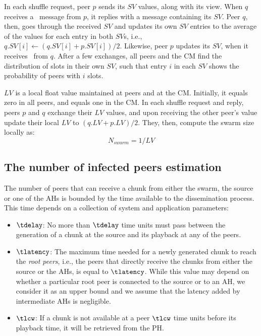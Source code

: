 In each shuffle request, peer $p$ sends its $SV$ values, along with its view. When $q$ receives a \request\ message from $p$, it replies with a message containing its $SV$. Peer $q$, then, goes through the
received $SV$ and updates its own $SV$ entries to the average of the values for each entry in both $SV$s, i.e., $q.SV[i] \gets (q.SV[i] + p.SV[i])/2$. Likewise, peer $p$ updates its $SV$, when it receives \reply\ from $q$. After a few exchanges, all peers and the CM find the distribution of slots in their own $SV$, such that entry $i$ in each $SV$ shows the probability of peers with $i$ slots.

$LV$ is a local float value maintained at peers and at the CM. Initially, it equals zero in all
peers, and equals one in the CM. In each shuffle request and reply, peers $p$ and $q$ exchange their $LV$ values, and upon receiving the other peer's value update their local $LV$ to $(q.LV + p.LV)/2$. They, then, compute
the swarm size locally as:
\begin{equation}
N_{swarm} = 1/LV
\end{equation}

\subsection{The number of infected peers estimation} \label{sec:estimation}
The number of peers that can receive a chunk from either the swarm, the source
or one of the AHs is bounded by the time available to the dissemination
process. This time depends on a collection of system and application
parameters:
\begin{itemize}
\item $\tdelay$: No more than $\tdelay$ time units must pass between the
generation of a chunk at the source and its playback at any of the peers.
\item $\tlatency$: The maximum time needed for a newly generated chunk to
reach the {\em root peers}, i.e., the peers that directly receive the chunks from
either the source or the AHs, is equal to $\tlatency$. While this value may depend on
whether a particular root peer is connected to the source or to an AH, we
consider it as an upper bound and we assume that the latency added by intermediate AHs is
negligible.
\item $\tlcw$: If a chunk is not available at a peer $\tlcw$ time units before
its playback time, it will be retrieved from the PH.
\end{itemize}

